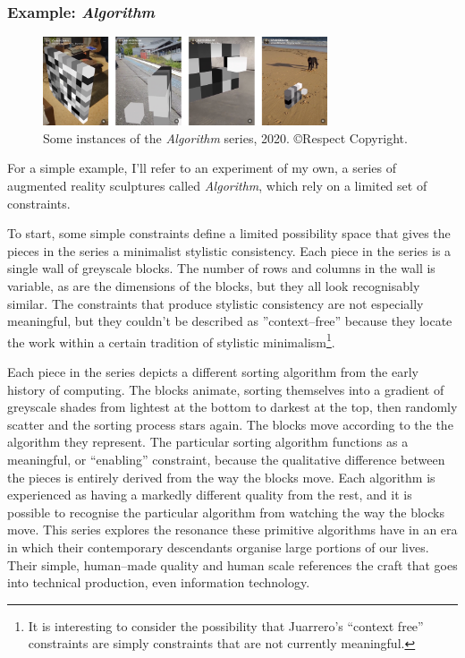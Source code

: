 \documentclass[letterpaper]{article}
\begin{document}
    \subsubsection{Example: \emph{Algorithm}}

    \begin{figure}[h]
    \includegraphics[width=3.31in]{bubble-sort.png}
    \caption{Some instances of the \emph{Algorithm} series, 2020. \copyright Respect Copyright.}
    \end{figure}

    For a simple example, I'll refer to an experiment of my own, a series of augmented reality sculptures called \emph{Algorithm}, which rely on a limited set of constraints.
    
    To start, some simple constraints define a limited possibility space that gives the pieces in the series a minimalist stylistic consistency. Each piece in the series is a single wall of greyscale blocks. The number of rows and columns in the wall is variable, as are the dimensions of the blocks, but they all look recognisably similar. The constraints that produce stylistic consistency are not especially meaningful, but they couldn't be described as ”context–free” because they locate the work within a certain tradition of stylistic minimalism\footnote{
        It is interesting to consider the possibility that Juarrero's “context free” constraints are simply constraints that are not currently meaningful.
    }.
    
    Each piece in the series depicts a different sorting algorithm from the early history of computing. The blocks animate, sorting themselves into a gradient of greyscale shades from lightest at the bottom to darkest at the top, then randomly scatter and the sorting process stars again. The blocks move according to the the algorithm they represent. The particular sorting algorithm functions as a meaningful, or “enabling” constraint, because the qualitative difference between the pieces is entirely derived from the way the blocks move. Each algorithm is experienced as having a markedly different quality from the rest, and it is possible to recognise the particular algorithm from watching the way the blocks move. This series explores the resonance these primitive algorithms have in an era in which their contemporary descendants organise large portions of our lives. Their simple, human–made quality and human scale references the craft that goes into technical production, even information technology.
\end{document}
